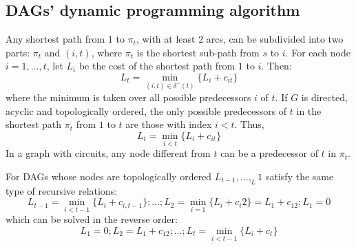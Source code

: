 \documentclass[12pt, a4paper]{report}
\newtheorem[style=M,bodystyle=\normalfont]{proposition}{Proposition}
\newtheorem[style=M,bodystyle=\normalfont]{theorem}{Theorem}
\newtheorem[style=M,bodystyle=\normalfont]{corollary}{Corollary}
\newtheorem[style=M,bodystyle=\normalfont]{lemma}{Lemma}
\newtheorem[style=M,bodystyle=\normalfont]{definition}{Definition}
\begin{document}
    \subsection{DAGs' dynamic programming algorithm}
    Any shortest path from 1 to $\pi_t$, with at least 2 arcs, can be subdivided into two parts: $\pi_t$ and $(i,t)$, where $\pi_t$ is the shortest sub-path from $s$ to $i$. 
    For each node  $i=1,\dots,t$, let $L_i$ be the cost of the shortest path from $1$ to $i$. Then: 
    \[L_t=\min_{(i,t) \in \delta^{-}(t)}\{L_i+c_{it}\}\]
    where the minimum is taken over all possible predecessors $i$ of $t$. If $G$ is directed, acyclic and topologically ordered, the only possible predecessors of $t$ in the shortest 
    path $\pi_t$ from $1$ to $t$ are those with index $i < t$. Thus,
    \[L_t=\min_{i<t}\{L_i+c_{it}\}\]
    In a graph with circuits, any node different from $t$ can be a predecessor of $t$ in $\pi_t$.  

    For DAGs whose nodes are topologically ordered $L_{t-1},\dots,_L1$ satisfy the same type of recursive relations:
    \[L_{t-1}=\min_{i<t-1}\{L_i+c_{i,t-1}\};\dots;L_2=\min_{i=1}\{L_i+c_i2\}=L_1+c_{12};L_1=0\]
    which can be solved in the reverse order:
    \[L_1=0;L_2=L_1+c_{12};\dots;L_{t}=\min_{i<t-1}\{L_i+c_{t}\}\]
\end{document}
